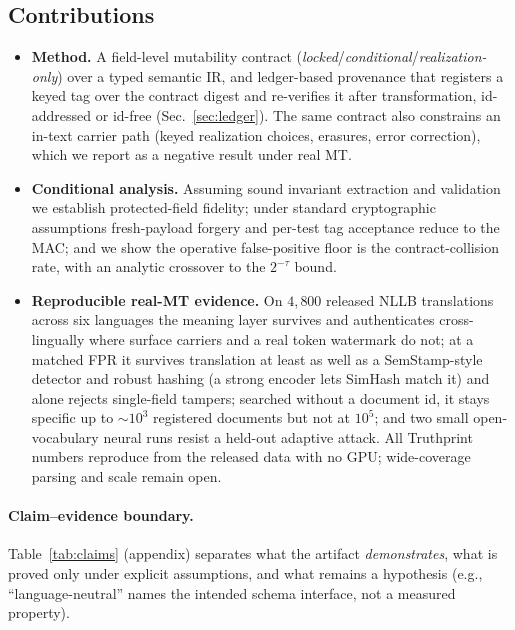 \documentclass[11pt]{article}
\begin{document}
\subsection{Contributions}
\begin{itemize}[leftmargin=*]
  \item \textbf{Method.} A field-level mutability contract (\emph{locked}/\emph{conditional}/\emph{realization-only}) over a typed semantic IR, and ledger-based provenance that registers a keyed tag over the contract digest and re-verifies it after transformation, id-addressed or id-free (Sec.~\ref{sec:ledger}). The same contract also constrains an in-text carrier path (keyed realization choices, erasures, error correction), which we report as a negative result under real MT.
  \item \textbf{Conditional analysis.} Assuming sound invariant extraction and validation we establish protected-field fidelity; under standard cryptographic assumptions fresh-payload forgery and per-test tag acceptance reduce to the MAC; and we show the operative false-positive floor is the contract-collision rate, with an analytic crossover to the $2^{-\tau}$ bound.
  \item \textbf{Reproducible real-MT evidence.} On $4{,}800$ released NLLB translations across six languages the meaning layer survives and authenticates cross-lingually where surface carriers and a real token watermark do not; at a matched FPR it survives translation at least as well as a SemStamp-style detector and robust hashing (a strong encoder lets SimHash match it) and alone rejects single-field tampers; searched without a document id, it stays specific up to ${\sim}10^3$ registered documents but not at $10^5$; and two small open-vocabulary neural runs resist a held-out adaptive attack. All Truthprint numbers reproduce from the released data with no GPU; wide-coverage parsing and scale remain open.
\end{itemize}

\paragraph{Claim--evidence boundary.} Table~\ref{tab:claims} (appendix) separates what the artifact \emph{demonstrates}, what is proved only under explicit assumptions, and what remains a hypothesis (e.g., ``language-neutral'' names the intended schema interface, not a measured property).
\end{document}
